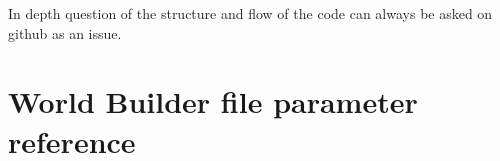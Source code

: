 \documentclass{book}
\newcommand{\WB}{{World Builder}}
\begin{document}
In depth question of the structure and flow of the code can always be asked on github as an issue.



\appendix
\chapter{\WB{} file parameter reference}
\label{chapter:WB_file_parameter_reference}

\end{document}
